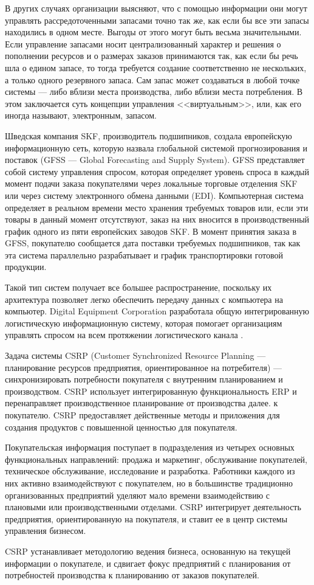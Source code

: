 В других случаях организации выясняют, что с помощью информации они могут управлять рассредоточенными запасами точно так же, как если бы все эти запасы находились в одном месте.
Выгоды от этого могут быть весьма значительными.
Если управление запасами носит централизованный характер и решения о пополнении ресурсов и о размерах заказов принимаются так, как если бы речь шла о едином запасе, то тогда требуется создание соответственно не нескольких, а только одного резервного запаса.
Сам запас может создаваться в любой точке системы --- либо вблизи места производства, либо вблизи места потребления.
В этом заключается суть концепции управления <<виртуальным>>, или, как его иногда называют, электронным, запасом.

Шведская компания SKF, производитель подшипников, создала европейскую информационную сеть, которую назвала глобальной системой прогнозирования и поставок (GFSS --- Global Forecasting and Supply System).
GFSS представляет собой систему управления спросом, которая определяет уровень спроса в каждый момент подачи заказа покупателями через локальные торговые отделения SKF или через систему электронного обмена данными (EDI).
Компьютерная система определяет в реальном времени место хранения требуемых товаров или, если эти товары в данный момент отсутствуют, заказ на них вносится в производственный график одного из пяти европейских заводов SKF.
В момент принятия заказа в GFSS, покупателю сообщается дата поставки требуемых подшипников, так как эта система параллельно разрабатывает и график транспортировки готовой продукции.

Такой тип систем получает все большее распространение, поскольку их архитектура позволяет легко обеспечить передачу данных с компьютера на компьютер.
Digital Equipment Corporation разработала общую интегрированную логистическую информационную систему, которая помогает организациям управлять спросом на всем протяжении логистического канала \cite[с. 225--228]{christopher}.

Задача системы CSRP (Customer Synchronized Resource Planning --- планирование ресурсов предприятия, ориентированное на потребителя) --- синхронизировать потребности покупателя с внутренним планированием и производством.
CSRP использует интегрированную функциональность ERP и перенаправляет производственное планирование от производства далее. к покупателю.
CSRP предоставляет действенные методы и приложения для создания продуктов с повышенной ценностью для покупателя.

Покупательская информация поступает в подразделения из четырех основных функциональных направлений: продажа и маркетинг, обслуживание покупателей, техническое обслуживание, исследование и разработка.
Работники каждого из них активно взаимодействуют с покупателем, но в большинстве традиционно организованных предприятий уделяют мало времени взаимодействию с плановыми или производственными отделами.
CSRP интегрирует деятельность предприятия, ориентированную на покупателя, и ставит ее в центр системы управления бизнесом.

CSRP устанавливает методологию ведения бизнеса, основанную на текущей информации о покупателе, и сдвигает фокус предприятий с планирования от потребностей производства к планированию от заказов покупателей.








